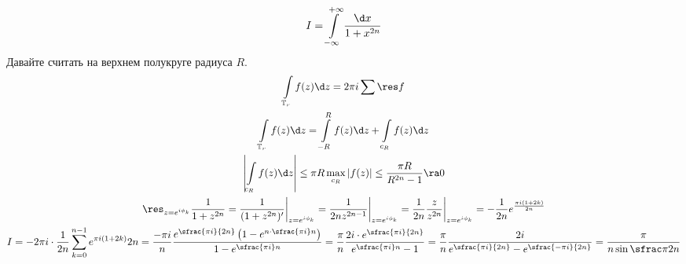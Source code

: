 \begin{exmp}
	\begin{gather*}
		I = \int\limits_{-\infty}^{+\infty} \frac{\d x}{1 + x^{2n}}
	\end{gather*}
	Давайте считать на верхнем полукруге радиуса $R$.
	\begin{gather*}
		\int\limits_{\mathbb T_r} f(z) \d z = 2\pi i \sum \res f \\
		\int\limits_{\mathbb T_r} f(z) \d z = \int\limits_{-R}^R f(z) \d z + \int\limits_{c_R} f(z) \d z \\
		\left| \int\limits_{c_R} f(z) \d z \right|
		\le \pi R\max_{c_R} |f(z)|
		\le \frac{\pi R}{R^{2n}-1} \ra 0 \\
		\res_{z=e^{i\phi_k}} \frac1{1+z^{2n}}
		= \frac1{(1+z^{2n})'} \biggr|_{z=e^{i\phi_k}}
		= \frac1{2nz^{2n-1}} \biggr|_{z=e^{i\phi_k}}
		= \frac1{2n} \frac z{z^{2n}} \biggr|_{z=e^{i\phi_k}}
		= -\frac1{2n} e^{\frac{\pi i(1+2k)}{2n}} \\
		I
		= -2\pi i \cdot \frac1{2n} \sum_{k=0}^{n-1} e^{\pi i(1+2k)}{2n}
		= \frac{-\pi i}n \frac{e^{\sfrac{\pi i}{2n}} \left(1 - e^{n \cdot \sfrac{\pi i}n}\right)}{1-e^{\sfrac{\pi i}n}}
		= \frac{\pi}n \frac{2i \cdot e^{\sfrac{\pi i}{2n}}}{e^{\sfrac{\pi i}n} - 1}
		= \frac{\pi}n \frac{2i}{e^{\sfrac{\pi i}{2n}} - e^{\sfrac{-\pi i}{2n}}}
		= \frac\pi{n \sin \sfrac\pi{2n}}
	\end{gather*}
\end{exmp}

